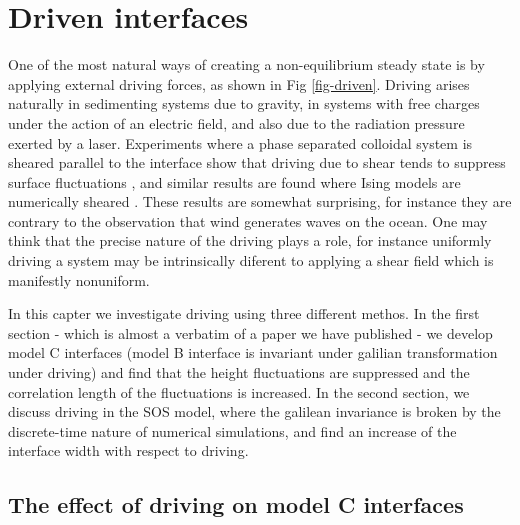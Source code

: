 \chapter{Driven interfaces}
\label{chap-driven}

One of the most natural ways of creating a non-equilibrium steady state is by applying
external driving forces, as shown in Fig \ref{fig-driven}. Driving arises naturally in sedimenting systems due to gravity, in systems with free charges under the action of an electric field, and also due to the radiation pressure exerted by a laser. Experiments where a phase separated colloidal system is sheared parallel to the interface show that driving due to shear tends to suppress surface fluctuations \cite{derks_suppression_2006}, and similar results are found where Ising models are numerically sheared \cite{smith_interfaces_2008,smith_lateral_2010}. These results are somewhat surprising, for instance they
are contrary to the observation that wind generates waves on the ocean. One may think that the precise nature of the driving plays a role, for instance uniformly driving a system may be intrinsically diferent to applying a shear field which is manifestly nonuniform. 

In this capter we investigate driving using three different methos. 
In the first section - which is almost a verbatim of a paper we have published \cite{dean_effect_2020} -  we develop model C interfaces (model B interface is invariant under galilian transformation under driving) and find that the height fluctuations are suppressed and the correlation length of the fluctuations is increased. 
In the second section, we discuss driving in the SOS model, where the galilean invariance is broken by the discrete-time nature of numerical simulations, and find an increase of the interface width with respect to driving.

    \section{The effect of driving on model C interfaces}

